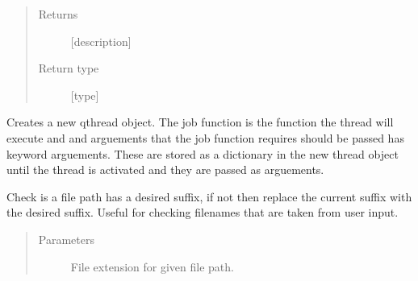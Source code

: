 \documentclass[letterpaper,10pt,english]{sphinxmanual}
\begin{document}
\begin{fulllineitems}
\begin{fulllineitems}
\begin{quote}
\begin{description}
\begin{itemize}
\end{itemize}

\item[{Returns}] \leavevmode
{[}description{]}

\item[{Return type}] \leavevmode
{[}type{]}

\end{description}\end{quote}

\end{fulllineitems}


\begin{fulllineitems}
\label{\detokenize{polo.utils:polo.utils.io_utils.RunSerializer.make_thread}}
Creates a new qthread object. The job function is the
function the thread will execute and and arguements that the job
function requires should be passed has keyword arguements. These are
stored as a dictionary in the new thread object until the thread is
activated and they are passed as arguements.

\end{fulllineitems}


\begin{fulllineitems}
\label{\detokenize{polo.utils:polo.utils.io_utils.RunSerializer.path_suffix_checker}}
Check is a file path has a desired suffix, if not then replace the
current suffix with the desired suffix. Useful for checking filenames
that are taken from user input.
\begin{quote}\begin{description}
\item[{Parameters}] \leavevmode
{} \textendash{} File extension for given file path.


\end{description}
\end{quote}
\end{fulllineitems}
\end{fulllineitems}
\end{document}
